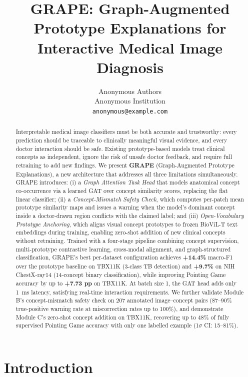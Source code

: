 \documentclass{article}
\title{GRAPE: Graph-Augmented Prototype Explanations for\\
Interactive Medical Image Diagnosis}
\author{%
  Anonymous Authors\\
  Anonymous Institution\\
  \texttt{anonymous@example.com}
}
\begin{document}
\maketitle

\begin{abstract}
Interpretable medical image classifiers must be both accurate and trustworthy: every prediction should be traceable to clinically meaningful visual evidence, and every doctor interaction should be safe.
Existing prototype-based models treat clinical concepts as independent, ignore the risk of unsafe doctor feedback, and require full retraining to add new findings.
We present \textbf{GRAPE} (Graph-Augmented Prototype Explanations), a new architecture that addresses all three limitations simultaneously.
GRAPE introduces: (i) a \emph{Graph Attention Task Head} that models anatomical concept co-occurrence via a learned GAT over concept similarity scores, replacing the flat linear classifier; (ii) a \emph{Concept-Mismatch Safety Check}, which computes per-patch mean prototype similarity maps and issues a warning when the model's dominant concept inside a doctor-drawn region conflicts with the claimed label; and (iii) \emph{Open-Vocabulary Prototype Anchoring}, which aligns visual concept prototypes to frozen BioViL-T text embeddings during training, enabling zero-shot addition of new clinical concepts without retraining.
Trained with a four-stage pipeline combining concept supervision, multi-prototype contrastive learning, cross-modal alignment, and graph-structured classification, GRAPE's best per-dataset configuration achieves \textbf{+14.4\%} macro-F1 over the prototype baseline on TBX11K (3-class TB detection) and \textbf{+9.7\%} on NIH ChestX-ray14 (14-concept binary classification), while improving Pointing Game accuracy by up to \textbf{+7.73 pp} on TBX11K.
At batch size 1, the GAT head adds only 1~ms latency, satisfying real-time interaction requirements.
We further validate Module B's concept-mismatch safety check on 207 annotated image--concept pairs (87--90\% true-positive warning rate at miscorrection rates up to 100\%), and demonstrate Module C's zero-shot concept addition on TBX11K, recovering up to 48\% of fully supervised Pointing Game accuracy with only one labelled example (1$\sigma$ CI: 15--81\%).
\end{abstract}

\section{Introduction}
\label{sec:intro}
\end{document}
